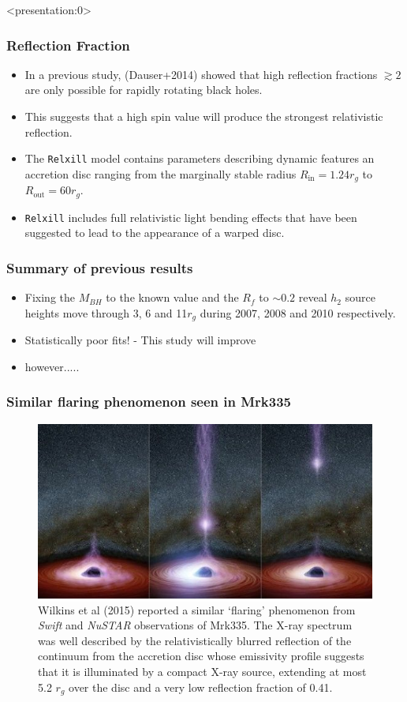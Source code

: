 \documentclass[]{beamer}
\begin{document}
\begin{frame} <presentation:0>
\frametitle{Reflection Fraction}
\begin{itemize}
\item In a previous study, (Dauser+2014) showed that high reflection fractions $\gtrsim 2$ are only possible for rapidly rotating black holes. \pause
\item This suggests that a high spin value will produce the strongest relativistic reflection. \pause
\item The \texttt{Relxill} model contains parameters describing dynamic features an accretion disc ranging from the marginally stable radius $R_\text{in} = 1.24 r_g$ to $R_\text{out} = 60 r_g$.\pause
\item \texttt{Relxill} includes full relativistic light bending effects that have been suggested to lead to the appearance of a warped disc.
\end{itemize} \end{frame}


\begin{frame}
\frametitle{Summary of previous results}
\begin{itemize} 
    \item Fixing the $M_{BH}$ to the known value and the $R_f$  to $\sim 0.2$ reveal $h_2$ source heights move through 3, 6 and 11$r_g$ during 2007, 2008 and 2010 respectively.\pause
    \item Statistically poor fits! - This study will improve \pause
    \item however.....
    \end{itemize}
\end{frame}

\begin{frame}
\frametitle{Similar flaring phenomenon seen in Mrk335}
\begin{figure}
\colorbox{white}{\includegraphics[scale=.35]{mrk335_jets.jpg}}\\
{\footnotesize  Wilkins et al (2015) reported a similar `flaring' phenomenon from \textit{Swift} and \textit{NuSTAR} observations of Mrk335. The X-ray spectrum was well described by the relativistically blurred reflection of the continuum from the accretion disc whose emissivity profile suggests that it is illuminated by a compact X-ray source, extending at most 5.2 $r_g$ over the disc and a very low reflection fraction of 0.41.}
\end{figure}
\end{frame}
\end{document}

